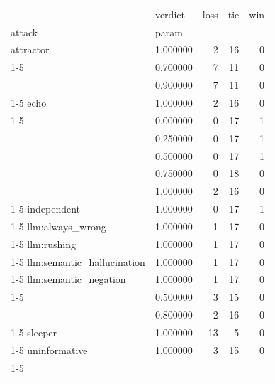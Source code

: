 \begin{tabular}{llrrr}
\toprule
 & verdict & loss & tie & win \\
attack & param &  &  &  \\
\midrule
attractor & 1.000000 & 2 & 16 & 0 \\
\cline{1-5}
\multirow[t]{2}{*}{camouflage} & 0.700000 & 7 & 11 & 0 \\
 & 0.900000 & 7 & 11 & 0 \\
\cline{1-5}
echo & 1.000000 & 2 & 16 & 0 \\
\cline{1-5}
\multirow[t]{5}{*}{gate\_aware} & 0.000000 & 0 & 17 & 1 \\
 & 0.250000 & 0 & 17 & 1 \\
 & 0.500000 & 0 & 17 & 1 \\
 & 0.750000 & 0 & 18 & 0 \\
 & 1.000000 & 2 & 16 & 0 \\
\cline{1-5}
independent & 1.000000 & 0 & 17 & 1 \\
\cline{1-5}
llm:always\_wrong & 1.000000 & 1 & 17 & 0 \\
\cline{1-5}
llm:rushing & 1.000000 & 1 & 17 & 0 \\
\cline{1-5}
llm:semantic\_hallucination & 1.000000 & 1 & 17 & 0 \\
\cline{1-5}
llm:semantic\_negation & 1.000000 & 1 & 17 & 0 \\
\cline{1-5}
\multirow[t]{2}{*}{partial} & 0.500000 & 3 & 15 & 0 \\
 & 0.800000 & 2 & 16 & 0 \\
\cline{1-5}
sleeper & 1.000000 & 13 & 5 & 0 \\
\cline{1-5}
uninformative & 1.000000 & 3 & 15 & 0 \\
\cline{1-5}
\bottomrule
\end{tabular}

